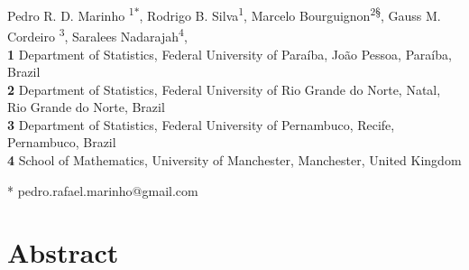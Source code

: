 \documentclass[10pt,letterpaper]{article}
\begin{document}
\vspace*{0.2in}

\begin{flushleft}
{\Large
\textbf{}}
\newline \vspace{0.3cm}

Pedro R. D. Marinho \textsuperscript{1${*}$},
Rodrigo B. Silva\textsuperscript{1\dag},
Marcelo Bourguignon\textsuperscript{2\S},
Gauss M. Cordeiro \textsuperscript{3\ddag},
Saralees Nadarajah\textsuperscript{4\kreuz},
\\
\bigskip
\textbf{1} Department of Statistics, Federal University of Para\'{i}ba, João Pessoa, Paraíba, Brazil
\\
\textbf{2} Department of Statistics, Federal University of Rio Grande do Norte, Natal, Rio Grande do Norte, Brazil
\\
\textbf{3} Department of Statistics, Federal University of Pernambuco, Recife, Pernambuco, Brazil
\\
\textbf{4} School of Mathematics, University of Manchester, Manchester, United Kingdom
\bigskip

* pedro.rafael.marinho@gmail.com

\end{flushleft}

\section*{Abstract}
\end{document}
